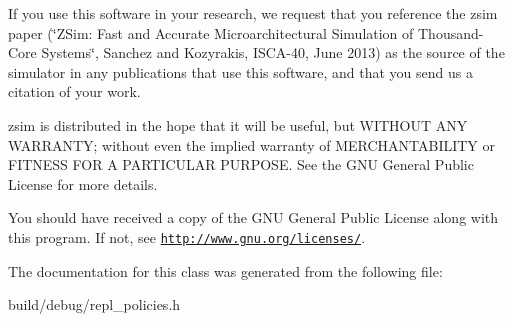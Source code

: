 If you use this software in your research, we request that you reference the zsim paper (\char`\"{}\-Z\-Sim\-: Fast and Accurate Microarchitectural Simulation of
\-Thousand-\/\-Core Systems\char`\"{}, Sanchez and Kozyrakis, I\-S\-C\-A-\/40, June 2013) as the source of the simulator in any publications that use this software, and that you send us a citation of your work.

zsim is distributed in the hope that it will be useful, but W\-I\-T\-H\-O\-U\-T A\-N\-Y W\-A\-R\-R\-A\-N\-T\-Y; without even the implied warranty of M\-E\-R\-C\-H\-A\-N\-T\-A\-B\-I\-L\-I\-T\-Y or F\-I\-T\-N\-E\-S\-S F\-O\-R A P\-A\-R\-T\-I\-C\-U\-L\-A\-R P\-U\-R\-P\-O\-S\-E. See the G\-N\-U General Public License for more details.

You should have received a copy of the G\-N\-U General Public License along with this program. If not, see \href{http://www.gnu.org/licenses/}{\tt http\-://www.\-gnu.\-org/licenses/}. 

The documentation for this class was generated from the following file\-:\begin{DoxyCompactItemize}
\item 
build/debug/repl\-\_\-policies.\-h\end{DoxyCompactItemize}
